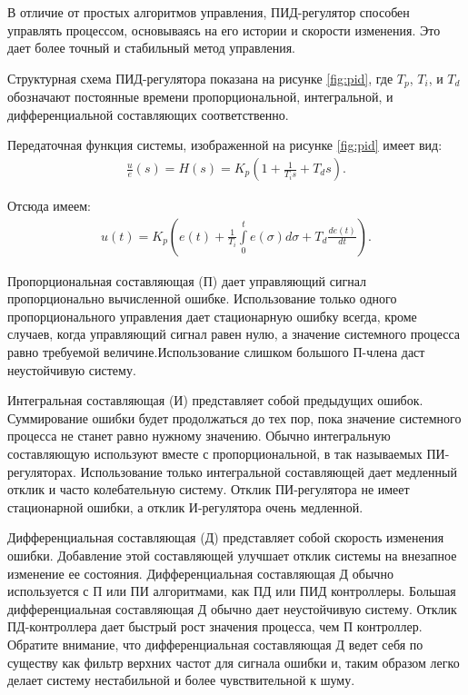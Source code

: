         В отличие от простых алгоритмов управления, ПИД-регулятор способен
        управлять процессом, основываясь на его истории и скорости изменения.
        Это дает более точный и стабильный метод управления.

        Структурная схема ПИД-регулятора показана на рисунке \ref{fig:pid}, где
        $T_p$, $T_i$, и $T_d$ обозначают постоянные времени пропорциональной,
        интегральной, и дифференциальной составляющих соответственно.

        Передаточная функция системы, изображенной на рисунке \ref{fig:pid}
        имеет вид:
        \begin{gather*}
            \frac{u}{e}(s) = H(s) = K_p \left(1 + \frac{1}{T_i s} + T_d s\right).
        \end{gather*}

        Отсюда имеем:
        \begin{gather*}
            u(t) = K_p \left( e(t)+\frac{1}{T_i} 
                \int \limits_0^t e(\sigma)d \sigma + T_d \frac{de(t)}{dt} \right).
        \end{gather*}

        Пропорциональная составляющая (П) дает управляющий сигнал
        пропорционально вычисленной ошибке. Использование только одного
        пропорционального управления дает стационарную ошибку всегда, кроме
        случаев, когда управляющий сигнал равен нулю, а значение системного
        процесса равно требуемой величине.Использование слишком большого
        П-члена даст неустойчивую систему. 

        Интегральная составляющая (И) представляет собой предыдущих ошибок.
        Суммирование ошибки будет продолжаться до тех пор, пока значение
        системного процесса не станет равно нужному значению. Обычно
        интегральную составляющую используют вместе с пропорциональной, в так
        называемых ПИ-регуляторах. Использование только интегральной
        составляющей дает медленный отклик и часто колебательную систему.
        Отклик ПИ-регулятора не имеет стационарной ошибки, а отклик
        И-регулятора очень медленной.

        Дифференциальная составляющая (Д) представляет собой скорость изменения
        ошибки. Добавление этой составляющей улучшает отклик системы на
        внезапное изменение ее состояния. Дифференциальная составляющая Д
        обычно используется с П или ПИ алгоритмами, как ПД или ПИД контроллеры.
        Большая дифференциальная составляющая Д обычно дает неустойчивую
        систему. Отклик ПД-контроллера дает быстрый рост значения процесса, чем
        П контроллер. Обратите внимание, что дифференциальная составляющая Д
        ведет себя по существу как фильтр верхних частот для сигнала ошибки и,
        таким образом легко делает систему нестабильной и более чувствительной
        к шуму.

